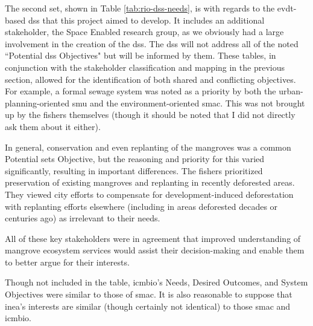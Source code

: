 The second set, shown in Table \ref{tab:rio-dss-needs}, is with regards to the \ac{evdt}-based \ac{dss} that this project aimed to develop. It includes an additional stakeholder, the Space Enabled research group, as we obviously had a large involvement in the creation of the \ac{dss}. The \ac{dss} will not address all of the noted ``Potential \ac{dss} Objectives" but will be informed by them. These tables, in conjunction with the stakeholder classification and mapping in the previous section, allowed for the identification of both shared and conflicting objectives. For example, a formal sewage system was noted as a priority by both the urban-planning-oriented \ac{smu} and the environment-oriented \ac{smac}. This was not brought up by the fishers themselves (though it should be noted that I did not directly ask them about it either). 

In general, conservation and even replanting of the mangroves was a common Potential \ac{sets} Objective, but the reasoning and priority for this varied significantly, resulting in important differences. The fishers prioritized preservation of existing mangroves and replanting in recently deforested areas. They viewed city efforts to compensate for development-induced deforestation with replanting efforts elsewhere (including in areas deforested decades or centuries ago) as irrelevant to their needs. 

All of these key stakeholders were in agreement that improved understanding of mangrove ecosystem services would assist their decision-making and enable them to better argue for their interests.  

Though not included in the table, \ac{icmbio}'s Needs, Desired Outcomes, and System Objectives were similar to those of \ac{smac}. It is also reasonable to suppose that \ac{inea}'s interests are similar (though certainly not identical) to those \ac{smac} and \ac{icmbio}.

